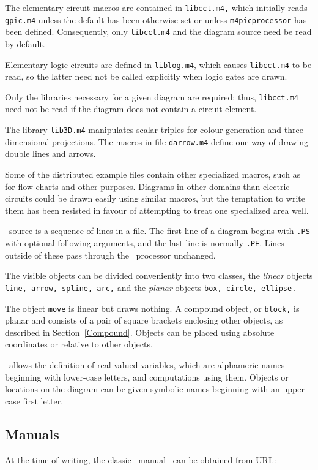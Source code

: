 The elementary circuit macros are contained in {\tt libcct.m4,} which
initially reads {\tt gpic.m4} unless the default has been otherwise set or
unless {\tt m4picprocessor} has been defined.  Consequently,
only {\tt libcct.m4} and the diagram source need be read by default.

Elementary logic circuits are defined in {\tt liblog.m4}, which causes
{\tt libcct.m4} to be read, so the latter need not be called explicitly
when logic gates are drawn.

Only the libraries necessary for a given diagram are required; thus,
{\tt libcct.m4} need not be read if the diagram does not contain a
circuit element.

The library {\tt lib3D.m4} manipulates scalar triples for colour
generation and three-dimensional projections.  The macros in file
{\tt darrow.m4} define one way of drawing double lines and arrows.

Some of the distributed example files contain other specialized macros,
such as for flow charts and other purposes.  Diagrams
in other domains than electric circuits could be drawn easily using
similar macros, but the temptation to write them has been resisted in
favour of attempting to treat one specialized area well.


\Pic\ source is a sequence of lines in a file.
The first line of a diagram begins with {\tt .PS} with optional following
arguments, and the last line is normally {\tt .PE}.
Lines outside of these pass through the \pic\ processor unchanged.

The visible objects can be divided conveniently into two classes, the
{\em linear} objects {\tt line, arrow, spline, arc,} and the
{\em planar} objects {\tt box, circle, ellipse.}

The object {\tt move} is linear but draws nothing.  A compound object,
or {\tt block,} is planar and consists of a pair of square brackets enclosing
other objects, as described in Section~\ref{Compound}.
Objects can be placed using absolute coordinates or relative to other objects.

\Pic\ allows the definition of real-valued variables, which are alphameric
names beginning with lower-case letters, and computations using them.
Objects or locations on the diagram can be given symbolic names
beginning with an upper-case first letter.

\subsection{Manuals}
At the time of writing, the classic \pic\ manual~\cite{KRpic} can be obtained
from URL:

